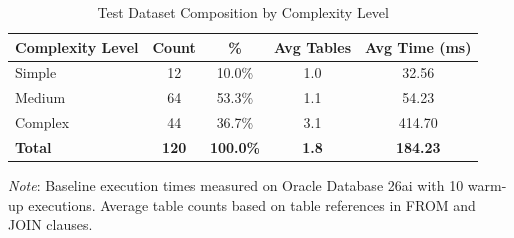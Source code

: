 \begin{table}[h]
\centering
\caption{Test Dataset Composition by Complexity Level}
\label{tab:dataset_summary}
\small
\begin{tabular}{lcccc}
\toprule
\textbf{Complexity Level} & \textbf{Count} & \textbf{\%} & \textbf{Avg Tables} & \textbf{Avg Time (ms)} \\
\midrule
Simple & 12 & 10.0\% & 1.0 & 32.56 \\
Medium & 64 & 53.3\% & 1.1 & 54.23 \\
Complex & 44 & 36.7\% & 3.1 & 414.70 \\
\midrule
\textbf{Total} & \textbf{120} & \textbf{100.0\%} & \textbf{1.8} & \textbf{184.23} \\
\bottomrule
\end{tabular}

\footnotesize
\textit{Note}: Baseline execution times measured on Oracle Database 26ai with 10 warm-up executions. Average table counts based on table references in FROM and JOIN clauses.
\end{table}
